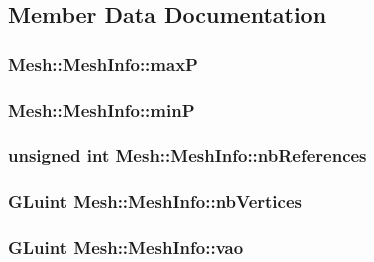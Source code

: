 \subsection{Member Data Documentation}
\hypertarget{struct_mesh_1_1_mesh_info_a1a3ed73fec39d12cf5fcd1dd554c2dea}{
\subsubsection[{max\+P}]{ Mesh\+::\+Mesh\+Info\+::max\+P}}\label{struct_mesh_1_1_mesh_info_a1a3ed73fec39d12cf5fcd1dd554c2dea}
\hypertarget{struct_mesh_1_1_mesh_info_add150c6f037445254a0ebee99abf3ba9}{
\subsubsection[{min\+P}]{ Mesh\+::\+Mesh\+Info\+::min\+P}}\label{struct_mesh_1_1_mesh_info_add150c6f037445254a0ebee99abf3ba9}
\hypertarget{struct_mesh_1_1_mesh_info_a8e32fc200e5ed8af32c409cac7b17342}{
\subsubsection[{nb\+References}]{\setlength{\rightskip}{0pt plus 5cm}unsigned int Mesh\+::\+Mesh\+Info\+::nb\+References}}\label{struct_mesh_1_1_mesh_info_a8e32fc200e5ed8af32c409cac7b17342}
\hypertarget{struct_mesh_1_1_mesh_info_a8869e5c769b3895876e32bed8252dffd}{
\subsubsection[{nb\+Vertices}]{\setlength{\rightskip}{0pt plus 5cm}G\+Luint Mesh\+::\+Mesh\+Info\+::nb\+Vertices}}\label{struct_mesh_1_1_mesh_info_a8869e5c769b3895876e32bed8252dffd}
\hypertarget{struct_mesh_1_1_mesh_info_af15096e0f0aa61fff7d8a1c223e547cf}{
\subsubsection[{vao}]{\setlength{\rightskip}{0pt plus 5cm}G\+Luint Mesh\+::\+Mesh\+Info\+::vao}}\label{struct_mesh_1_1_mesh_info_af15096e0f0aa61fff7d8a1c223e547cf}
